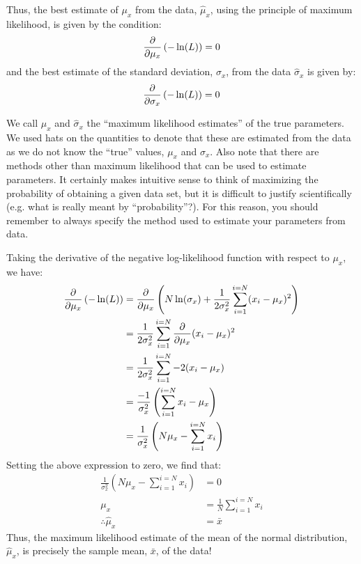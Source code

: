 Thus, the best estimate of $\mu_x$ from the data, $\hat\mu_x$, using the principle of maximum likelihood, is given by the condition:
\begin{align}
\label{eqn:muML}
\frac{\partial }{\partial \mu_x}\left(-\ln(L)\right)=0
\end{align}
and the best estimate of the standard deviation, $\sigma_x$, from the data $\hat\sigma_x$ is given by:
\begin{align}
\label{eqn:sigML}
\frac{\partial }{\partial \sigma_x}\left(-\ln(L)\right)=0
\end{align}

We call $\hat\mu_x$ and $\hat\sigma_x$ the ``maximum likelihood estimates'' of the true parameters. We used hats on the quantities to denote that these are estimated from the data as we do not know the ``true'' values, $\mu_x$ and $\sigma_x$. Also note that there are methods other than maximum likelihood that can be used to estimate parameters. It certainly makes intuitive sense to think of maximizing the probability of obtaining a given data set, but it is difficult to justify scientifically (e.g. what is really meant by ``probability''?). For this reason, you should remember to always specify the method used to estimate your parameters from data.

Taking the derivative of the negative log-likelihood function with respect to $\mu_x$, we have:
\begin{align}
\frac{\partial }{\partial \mu_x}\left(-\ln(L)\right) &= \frac{\partial }{\partial \mu_x}\left(N\ln(\sigma_x)+\frac{1}{2\sigma_x^2}\sum_{i=1}^{i=N}(x_i-\mu_x)^2\right)\nonumber\\
&=\frac{1}{2\sigma_x^2}\sum_{i=1}^{i=N}\frac{\partial }{\partial \mu_x}(x_i-\mu_x)^2\nonumber\\
&=\frac{1}{2\sigma_x^2}\sum_{i=1}^{i=N}-2(x_i-\mu_x)\nonumber\\
&=\frac{-1}{\sigma_x^2}\left(\sum_{i=1}^{i=N}x_i-\mu_x\right)\nonumber\\
&=\frac{1}{\sigma_x^2}\left(N\mu_x-\sum_{i=1}^{i=N}x_i\right)\nonumber\\
\end{align}
Setting the above expression to zero, we find that:
\begin{align}
\frac{1}{\sigma_x^2}\left(N\mu_x-\sum_{i=1}^{i=N}x_i\right)&=0\nonumber\\
\mu_x&=\frac{1}{N}\sum_{i=1}^{i=N}x_i\nonumber\\
\therefore \hat\mu_x&=\bar x
\end{align}
Thus, the maximum likelihood estimate of the mean of the normal distribution, $\hat\mu_x$, is precisely the sample mean, $\bar x$, of the data!

